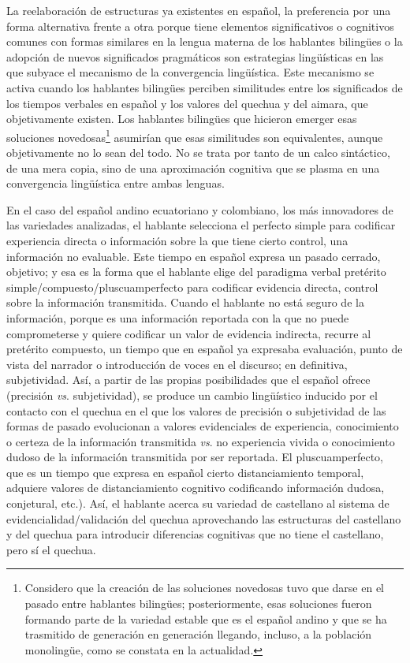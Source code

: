 \documentclass[output=paper]{../langscibook}
\begin{document}
La reelaboración de estructuras ya existentes en español, la preferencia por una forma alternativa frente a otra porque tiene elementos significativos o cognitivos comunes con formas similares en la lengua materna de los hablantes bilingües o la adopción de nuevos significados pragmáticos son estrategias lingüísticas en las que subyace el mecanismo de la convergencia lingüística. Este mecanismo se activa cuando los hablantes bilingües perciben similitudes entre los significados de los tiempos verbales en español y los valores del quechua y del aimara, que objetivamente existen. Los hablantes bilingües que hicieron emerger esas soluciones novedosas\footnote{Considero que la creación de las soluciones novedosas tuvo que darse en el pasado entre hablantes bilingües; posteriormente, esas soluciones fueron formando parte de la variedad estable que es el español andino y que se ha trasmitido de generación en generación llegando, incluso, a la población monolingüe, como se constata en la actualidad.} asumirían que esas similitudes son equivalentes, aunque objetivamente no lo sean del todo. No se trata por tanto de un calco sintáctico, de una mera copia, sino de una aproximación cognitiva que se plasma en una convergencia lingüística entre ambas lenguas.

En el caso del español andino ecuatoriano y colombiano, los más innovadores de las variedades analizadas, el hablante selecciona el perfecto simple para codificar experiencia directa o información sobre la que tiene cierto control, una información no evaluable. Este tiempo en español expresa un pasado cerrado, objetivo; y esa es la forma que el hablante elige del paradigma verbal pretérito simple/compuesto/pluscuamperfecto para codificar evidencia directa, control sobre la información transmitida. Cuando el hablante no está seguro de la información, porque es una información reportada con la que no puede comprometerse y quiere codificar un valor de evidencia indirecta, recurre al pretérito compuesto, un tiempo que en español ya expresaba evaluación, punto de vista del narrador o introducción de voces en el discurso; en definitiva, subjetividad. Así, a partir de las propias posibilidades que el español ofrece (precisión \textit{vs}. subjetividad), se produce un cambio lingüístico inducido por el contacto con el quechua en el que los valores de precisión o subjetividad de las formas de pasado evolucionan a valores evidenciales de experiencia, conocimiento o certeza de la información transmitida \textit{vs}. no experiencia vivida o conocimiento dudoso de la información transmitida por ser reportada. El pluscuamperfecto, que es un tiempo que expresa en español cierto distanciamiento temporal, adquiere valores de distanciamiento cognitivo codificando información dudosa, conjetural, etc.). Así, el hablante acerca su variedad de castellano al sistema de evidencialidad/validación del quechua aprovechando las estructuras del castellano y del quechua para introducir diferencias cognitivas que no tiene el castellano, pero sí el quechua. 
\end{document}
